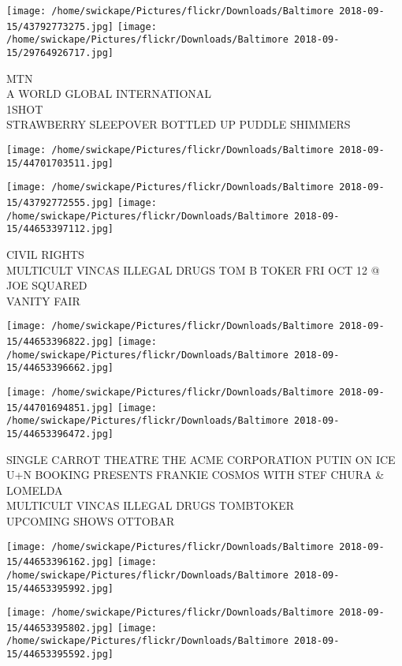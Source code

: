 \documentclass[10pt,letterpaper]{article}
\begin{document}
\texttt{[image: /home/swickape/Pictures/flickr/Downloads/Baltimore 2018-09-15/43792773275.jpg]}
\texttt{[image: /home/swickape/Pictures/flickr/Downloads/Baltimore 2018-09-15/29764926717.jpg]}

MTN\\
A WORLD GLOBAL INTERNATIONAL\\
1SHOT\\
STRAWBERRY SLEEPOVER BOTTLED UP PUDDLE SHIMMERS
\pagebreak

\texttt{[image: /home/swickape/Pictures/flickr/Downloads/Baltimore 2018-09-15/44701703511.jpg]}

\vspace{0.25in}
\texttt{[image: /home/swickape/Pictures/flickr/Downloads/Baltimore 2018-09-15/43792772555.jpg]}
\texttt{[image: /home/swickape/Pictures/flickr/Downloads/Baltimore 2018-09-15/44653397112.jpg]}

CIVIL RIGHTS\\
MULTICULT VINCAS ILLEGAL DRUGS TOM B TOKER FRI OCT 12 @ JOE SQUARED\\
VANITY FAIR
\pagebreak

\texttt{[image: /home/swickape/Pictures/flickr/Downloads/Baltimore 2018-09-15/44653396822.jpg]}
\texttt{[image: /home/swickape/Pictures/flickr/Downloads/Baltimore 2018-09-15/44653396662.jpg]}

\texttt{[image: /home/swickape/Pictures/flickr/Downloads/Baltimore 2018-09-15/44701694851.jpg]}
\texttt{[image: /home/swickape/Pictures/flickr/Downloads/Baltimore 2018-09-15/44653396472.jpg]}

SINGLE CARROT THEATRE THE ACME CORPORATION PUTIN ON ICE\\
U+N BOOKING PRESENTS FRANKIE COSMOS WITH STEF CHURA \& LOMELDA\\
MULTICULT VINCAS ILLEGAL DRUGS TOMBTOKER\\
UPCOMING SHOWS OTTOBAR
\pagebreak

\texttt{[image: /home/swickape/Pictures/flickr/Downloads/Baltimore 2018-09-15/44653396162.jpg]}
\texttt{[image: /home/swickape/Pictures/flickr/Downloads/Baltimore 2018-09-15/44653395992.jpg]}

\texttt{[image: /home/swickape/Pictures/flickr/Downloads/Baltimore 2018-09-15/44653395802.jpg]}
\texttt{[image: /home/swickape/Pictures/flickr/Downloads/Baltimore 2018-09-15/44653395592.jpg]}
\end{document}
